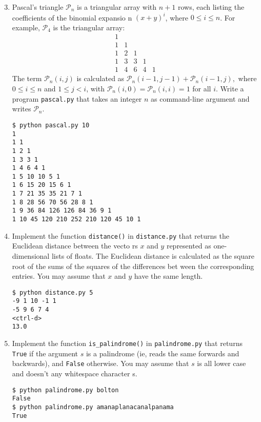 \documentclass[8pt,a4paper,compress]{beamer}
\begin{document}
\begin{frame}[fragile]
\begin{enumerate}\setcounter{enumi}{2}
\item Pascal's triangle $\mathcal{P}_n$ is a triangular array with $n+1$ rows, each listing the coefficients of the binomial expansio
n $(x+y)^i$, where $0 \leq i \leq n$. For example, $\mathcal{P}_4$ is the triangular array:
\[
\begin{matrix}
1 & & & \\
1 & 1 & & \\
1 & 2 & 1 & \\
1 & 3 & 3 & 1 \\
1 & 4 & 6 & 4 & 1
\end{matrix}
\]
The term $\mathcal{P}_n(i, j)$ is calculated as $\mathcal{P}_n(i-1, j-1)+\mathcal{P}_n(i-1, j),$ where $0 \leq i \leq n$ and $1 \leq j < i$, with $\mathcal{P}_n(i, 0) =
 \mathcal{P}_n(i, i) = 1$ for all $i$. Write a program \lstinline{pascal.py} that takes an integer $n$ as command-line argument and writes $\mathcal{P}_n$.

\begin{lstlisting}[language={}]
$ python pascal.py 10
1
1 1
1 2 1
1 3 3 1
1 4 6 4 1
1 5 10 10 5 1
1 6 15 20 15 6 1
1 7 21 35 35 21 7 1
1 8 28 56 70 56 28 8 1
1 9 36 84 126 126 84 36 9 1
1 10 45 120 210 252 210 120 45 10 1
\end{lstlisting}
\end{enumerate}
\end{frame}

\begin{frame}[fragile]
\begin{enumerate}\setcounter{enumi}{3}
\item Implement the function \lstinline{distance()} in \lstinline{distance.py} that returns the Euclidean distance between the vecto
rs $x$ and $y$ represented as one-dimensional lists of floats. The Euclidean distance is calculated as the square root of the sums of the squares of the differences bet
ween the corresponding entries. You may assume that $x$ and $y$ have the same length.

\begin{lstlisting}[language={}]
$ python distance.py 5
-9 1 10 -1 1
-5 9 6 7 4
<ctrl-d>
13.0
\end{lstlisting}

\item Implement the function \lstinline{is_palindrome()} in \lstinline{palindrome.py} that returns \lstinline{True} if the argument $s$ is a
 palindrome (ie, reads the same forwards and backwards), and \lstinline{False} otherwise. You may assume that $s$ is all lower case and doesn't any whitespace character
s.

\begin{lstlisting}[language={}]
$ python palindrome.py bolton
False
$ python palindrome.py amanaplanacanalpanama
True
\end{lstlisting}
\end{enumerate}
\end{frame}
\end{document}

